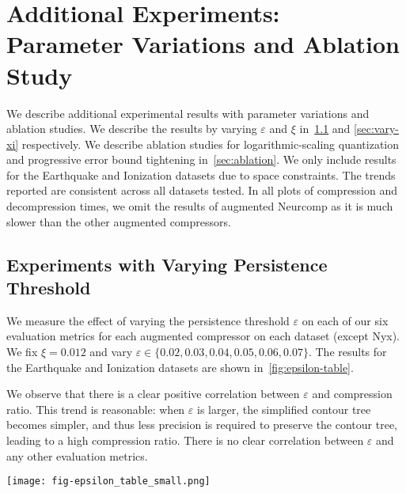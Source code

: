 \section{Additional Experiments: Parameter Variations and Ablation Study}
\label{sec:other-experiments}

We describe additional experimental results with parameter variations and ablation studies. 
We describe the results by varying $\varepsilon$ and $\xi$ in~\cref{sec:vary-epsilon} and \cref{sec:vary-xi} respectively. We describe ablation studies for logarithmic-scaling quantization and progressive error bound tightening in~\cref{sec:ablation}. We only include results for the Earthquake and Ionization datasets due to space constraints. The trends reported are consistent across all datasets tested. In all plots of compression and decompression times, we omit the results of augmented Neurcomp as it is much slower than the other augmented compressors.

\subsection{Experiments with Varying Persistence Threshold}
\label{sec:vary-epsilon}

We measure the effect of varying the persistence threshold $\varepsilon$ on each of our six evaluation metrics for each augmented compressor on each dataset (except Nyx). We fix $\xi = 0.012$ and vary $\varepsilon \in \{0.02,0.03,0.04,0.05,0.06,0.07\}$. The results for the Earthquake and Ionization datasets are shown in~\cref{fig:epsilon-table}.

We observe that there is a clear positive correlation between $\varepsilon$ and compression ratio. This trend is reasonable: when $\varepsilon$ is larger, the simplified contour tree becomes simpler, and thus less precision is required to preserve the contour tree, leading to a high compression ratio. There is no clear correlation between $\varepsilon$ and any other evaluation metrics.

\begin{figure*}[!ht]
\centering
\texttt{[image: fig-epsilon\_table\_small.png]}
\vspace{-6mm}
\caption{Each of the six evaluation metrics measured for the Earthquake and Ionization datasets as $\varepsilon$ varies. We fix $\xi = 0.012$. The augmented compressors are given as A-ZFP, A-SZ3, etc.}
\label{fig:epsilon-table}
\end{figure*}

